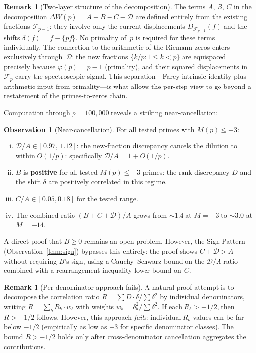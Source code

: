 \documentclass[11pt]{article}
\theoremstyle{definition}
\newtheorem{remark}[theorem]{Remark}
\newtheorem{observation}[theorem]{Observation}
\newcommand{\F}{\mathcal{F}}
\begin{document}
\begin{remark}[Two-layer structure of the decomposition]
The terms $A$, $B$, $C$ in the decomposition
$\Delta W(p) = A - B - C - \mathcal{D}$ are defined
entirely from the existing fractions $\F_{p-1}$: they
involve only the current displacements $D_{\F_{p-1}}(f)$
and the shifts $\delta(f) = f - \{pf\}$.  No primality
of~$p$ is required for these terms individually.  The
connection to the arithmetic of the Riemann zeros enters
exclusively through~$\mathcal{D}$: the new fractions
$\{k/p : 1 \le k < p\}$ are equispaced precisely because
$\varphi(p) = p - 1$ (primality), and their squared
displacements in $\F_p$ carry the spectroscopic signal.
This separation---Farey-intrinsic identity plus arithmetic
input from primality---is what allows the per-step view
to go beyond a restatement of the primes-to-zeros chain.
\end{remark}

Computation through $p = 100{,}000$ reveals a striking near-cancellation:

\begin{observation}[Near-cancellation]
For all tested primes with $M(p) \le -3$:
\begin{enumerate}[(i)]
  \item $\mathcal{D}/A \in [0.97,\, 1.12]$: the new-fraction discrepancy cancels the dilution
    to within $O(1/p)$: specifically $\mathcal{D}/A = 1 + O(1/p)$.
  \item $B$ is \textbf{positive} for all tested $M(p) \le -3$ primes:
    the rank discrepancy $D$ and
    the shift $\delta$ are positively correlated in this regime.
  \item $C/A \in [0.05, 0.18]$ for the tested range.
  \item The combined ratio $(B + C + \mathcal{D})/A$ grows from ${\sim}1.4$ at
    $M = -3$ to ${\sim}3.0$ at $M = -14$.
\end{enumerate}
\end{observation}

\noindent A direct proof that $B \ge 0$ remains an open problem.
However, the Sign Pattern (Observation~\ref{thm:sign}) bypasses
this entirely: the proof shows $C + \mathcal{D} > A$
without requiring $B$'s sign, using a Cauchy--Schwarz bound on
the $\mathcal{D}/A$ ratio
combined with a rearrangement-inequality lower bound on~$C$.

\begin{remark}[Per-denominator approach fails]

A natural proof attempt is to decompose the correlation ratio
$R = \sum D \cdot \delta / \sum \delta^2$ by individual
denominators, writing $R = \sum_b R_b \cdot w_b$ with
weights $w_b = \delta_b^2 / \sum \delta^2$.  If each
$R_b > -1/2$, then $R > -1/2$ follows.  However, this
approach \emph{fails}: individual $R_b$ values can be
far below $-1/2$ (empirically as low as $-3$ for specific
denominator classes).  The bound $R > -1/2$ holds only
after cross-denominator cancellation aggregates the
contributions.
\end{remark}
\end{document}
